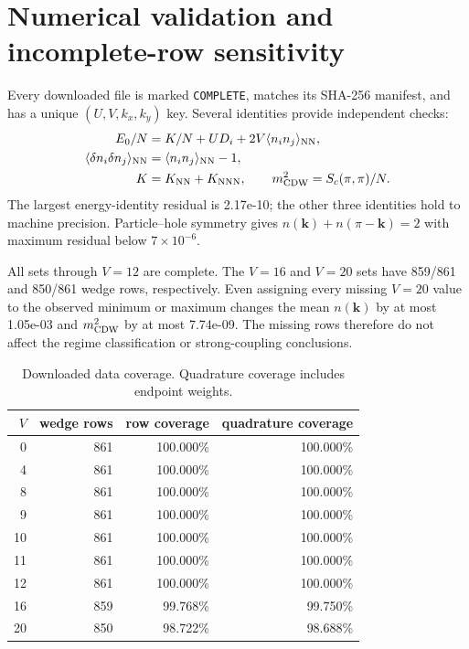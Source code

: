\documentclass[10pt]{article}
\newcommand{\vk}{\mathbf{k}}
\begin{document}
\section{Numerical validation and incomplete-row sensitivity}

Every downloaded file is marked \texttt{COMPLETE}, matches its SHA-256 manifest,
and has a unique $(U,V,k_x,k_y)$ key.  Several identities provide independent checks:
\begin{align*}
E_0/N &= K/N+UD_i+2V\langle n_i n_j\rangle_{\rm NN},\\
\langle\delta n_i\delta n_j\rangle_{\rm NN}
&=\langle n_i n_j\rangle_{\rm NN}-1,\\
K&=K_{\rm NN}+K_{\rm NNN},\qquad
m_{\rm CDW}^2=S_c(\pi,\pi)/N.
\end{align*}
The largest energy-identity residual is 2.17e-10; the other three identities
hold to machine precision.  Particle--hole symmetry gives
$n(\vk)+n(\pi-\vk)=2$ with maximum residual below $7\times10^{-6}$.

All sets through $V=12$ are complete.  The $V=16$ and $V=20$ sets have 859/861 and
850/861 wedge rows, respectively.  Even assigning every missing $V=20$ value to the
observed minimum or maximum changes the mean $n(\vk)$ by at most 1.05e-03 and
$m_{\rm CDW}^2$ by at most 7.74e-09.  The missing rows therefore do not affect the
regime classification or strong-coupling conclusions.

\begin{table}[htbp]
\centering
\caption{Downloaded data coverage.  Quadrature coverage includes endpoint weights.}
\begin{tabular}{rrrr}
\toprule
$V$ & wedge rows & row coverage & quadrature coverage\\
\midrule
0 & 861 & 100.000\% & 100.000\% \\
4 & 861 & 100.000\% & 100.000\% \\
8 & 861 & 100.000\% & 100.000\% \\
9 & 861 & 100.000\% & 100.000\% \\
10 & 861 & 100.000\% & 100.000\% \\
11 & 861 & 100.000\% & 100.000\% \\
12 & 861 & 100.000\% & 100.000\% \\
16 & 859 & 99.768\% & 99.750\% \\
20 & 850 & 98.722\% & 98.688\% \\
\bottomrule
\end{tabular}
\end{table}
\end{document}
